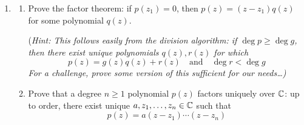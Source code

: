 \begin{exercises}
\begin{enumerate}
	    
	  \item\begin{enumerate}
	    \item Prove the factor theorem: if $p(z_1)=0$, then $p(z)=(z-z_1)q(z)$ for some polynomial $q(z)$.\par
	    (\emph{Hint: This follows easily from the division algorithm: if $\deg p\ge \deg g$, then there exist unique polynomials $q(z),r(z)$ for which
	    \[
	    	p(z)=g(z)q(z)+r(z)\quad\text{and}\quad \deg r<\deg g
	    \]
	    For a challenge, prove some version of this sufficient for our needs\ldots)
	    }
	    \item Prove that a degree $n\ge 1$ polynomial $p(z)$ factors uniquely over $\mathbb{C}$: up to order, there exist unique $a,z_1,\ldots,z_n\in\mathbb{C}$ such that
	    \[
	    	p(z)=a(z-z_1)\cdots(z-z_n)
	    \]
	  \end{enumerate}
	\end{enumerate}
\end{exercises}

